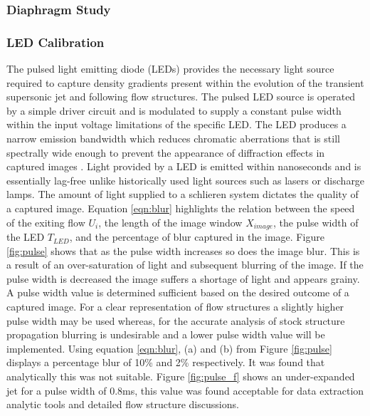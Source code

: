 \subsubsection{Diaphragm Study}

\subsubsection{LED Calibration}
The pulsed light emitting diode (LEDs) provides the necessary light source required to capture density gradients present within the evolution of the transient supersonic jet and following flow structures. The pulsed LED source is operated by a simple driver circuit and is modulated to supply a constant pulse width within the input voltage limitations of the specific LED. The LED produces a narrow emission bandwidth which reduces chromatic aberrations that is still spectrally wide enough to prevent the appearance of diffraction effects in captured images \citep{willert2012assessment}. Light provided by a LED is emitted within nanoseconds and is essentially lag-free unlike historically used light sources such as lasers or discharge lamps. The amount of light supplied to a schlieren system dictates the quality of a captured image. Equation \ref{eqn:blur} highlights the relation between the speed of the exiting flow $U_i$, the length of the image window $X_{image}$, the pulse width of the LED $T_{LED}$, and the percentage of blur captured in the image. Figure \ref{fig:pulse} shows that as the pulse width increases so does the image blur. This is a result of an over-saturation of light and subsequent blurring of the image. If the pulse width is decreased the image suffers a shortage of light and appears grainy. A pulse width value is determined sufficient based on the desired outcome of a captured image. For a clear representation of flow structures a slightly higher pulse width may be used whereas, for the accurate analysis of stock structure propagation blurring is undesirable and a lower pulse width value will be implemented. Using equation \ref{eqn:blur}, (a) and (b) from Figure \ref{fig:pulse} displays a percentage blur of 10\% and 2\% respectively. It was found that analytically this was not suitable. Figure \ref{fig:pulse_f} shows an under-expanded jet for a pulse width of 0.8ms, this value was found acceptable for data extraction analytic tools and detailed flow structure discussions.



